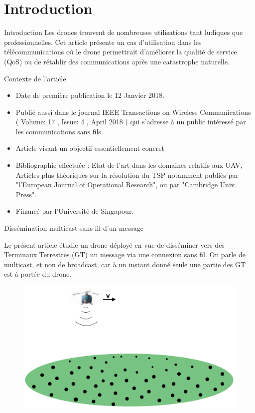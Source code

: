 

\section {Introduction}

\begin{frame}{Introduction}
  Les drones trouvent de nombreuses utilisations tant ludiques que professionnelles. Cet article présente un cas d'utilisation dans les télécommunications où le drone permettrait d'améliorer la qualité de service (QoS) ou de rétablir des communications après une catastrophe naturelle. 
 
 
\end{frame}


\begin{frame}{Contexte de l'article}
\begin{itemize}
	
	\item Date de première publication le 12 Janvier 2018.
	
	\item Publié aussi dans le journal IEEE Transactions on Wireless Communications 
	( Volume: 17 , Issue: 4 , April 2018 ) qui s'adresse à un public intéressé par les communications sans fils.
	
	\item Article visant un objectif essentiellement concret
	\item Bibliographie effectuée : Etat de l'art dans les domaines relatifs aux UAV, Articles plus théoriques sur 
	la résolution du TSP notamment publiés par "l'European Journal of Operational Research",
	ou par "Cambridge Univ. Press".
	\item Financé par l'Université de Singapour.
	
\end{itemize}
\end{frame}
 
\begin{frame}{Dissémination multicast sans fil d'un message}

Le présent article étudie un drone déployé en vue de disséminer vers des Terminaux Terrestres (GT) un message via une connexion sans fil. On parle de multicast, et non de broadcast, car à un instant donné seule une partie des GT est à portée du drone.

\begin{figure}
	\centering
	\includegraphics[width=0.7\linewidth]{images/multicast}
	\caption{}
	\label{fig:multicast}
\end{figure}

\end{frame}

